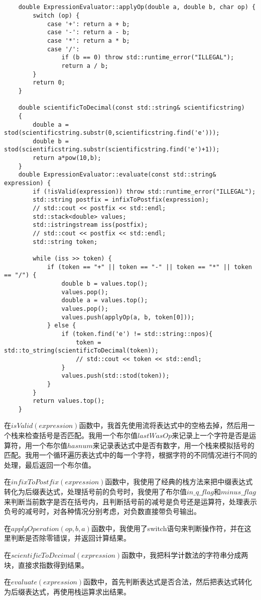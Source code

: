 \documentclass[UTF8]{ctexart}
\begin{document}
\begin{lstlisting}
    
    
    double ExpressionEvaluator::applyOp(double a, double b, char op) {
        switch (op) {
            case '+': return a + b;
            case '-': return a - b;
            case '*': return a * b;
            case '/':
                if (b == 0) throw std::runtime_error("ILLEGAL");
                return a / b;
        }
        return 0;
    }
    
    double scientificToDecimal(const std::string& scientificstring)
    {
        double a = stod(scientificstring.substr(0,scientificstring.find('e')));
        double b = stod(scientificstring.substr(scientificstring.find('e')+1));
        return a*pow(10,b);
    }
    double ExpressionEvaluator::evaluate(const std::string& expression) {
        if (!isValid(expression)) throw std::runtime_error("ILLEGAL");
        std::string postfix = infixToPostfix(expression);
        // std::cout << postfix << std::endl;
        std::stack<double> values;
        std::istringstream iss(postfix);
        // std::cout << postfix << std::endl;
        std::string token;
        
        while (iss >> token) {
            if (token == "+" || token == "-" || token == "*" || token == "/") {
                double b = values.top();
                values.pop();
                double a = values.top();
                values.pop();
                values.push(applyOp(a, b, token[0]));
            } else {
                if (token.find('e') != std::string::npos){
                    token = std::to_string(scientificToDecimal(token));
                    // std::cout << token << std::endl;
                }
                values.push(std::stod(token));
            }
        }
        return values.top();
    }    
\end{lstlisting}\par
在$isValid(expression)$函数中，我首先使用流将表达式中的空格去掉，然后用一个栈来检查括号是否匹配。我用一个布尔值$lastWasOp$来记录上一个字符是否是运算符，用一个布尔值$hasnum$来记录表达式中是否有数字，用一个栈来模拟括号的匹配。我用一个循环遍历表达式中的每一个字符，根据字符的不同情况进行不同的处理，最后返回一个布尔值。\par
在$infixToPostfix(expression)$函数中，我使用了经典的栈方法来把中缀表达式转化为后缀表达式，处理括号前的负号时，我使用了布尔值$in\_q\_flag$和$minus\_flag$来判断当前数字是否在括号内，且判断括号前的减号是负号还是运算符，处理表示负号的减号时，对各种情况分别考虑，对负数直接带负号输出。\par
在$applyOperation(op, b, a)$函数中，我使用了switch语句来判断操作符，并在这里判断是否除零错误，并返回计算结果。\par
在$scientificToDecimal(expression)$函数中，我把科学计数法的字符串分成两块，直接求指数得到结果。\par
在$evaluate(expression)$函数中，首先判断表达式是否合法，然后把表达式转化为后缀表达式，再使用栈运算求出结果。\par
\end{document}
